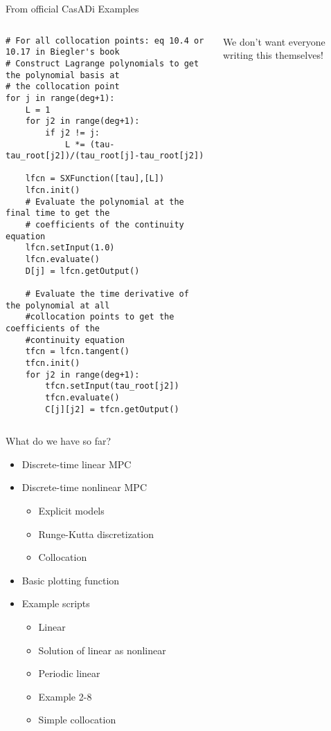 \documentclass[xcolor=dvipsnames]{beamer}
\begin{document}
\begin{frame}[fragile]{From official CasADi Examples}

\begin{columns}
    \begin{column}{.75\textwidth}
        
\begin{lstlisting}[style=python,basicstyle=\ttfamily\fontsize{6}{8}\selectfont]
# For all collocation points: eq 10.4 or 10.17 in Biegler's book
# Construct Lagrange polynomials to get the polynomial basis at
# the collocation point
for j in range(deg+1):
    L = 1
    for j2 in range(deg+1):
        if j2 != j:
            L *= (tau-tau_root[j2])/(tau_root[j]-tau_root[j2])
    
    lfcn = SXFunction([tau],[L])
    lfcn.init()
    # Evaluate the polynomial at the final time to get the
    # coefficients of the continuity equation
    lfcn.setInput(1.0)
    lfcn.evaluate()
    D[j] = lfcn.getOutput()
    
    # Evaluate the time derivative of the polynomial at all
    #collocation points to get the coefficients of the
    #continuity equation
    tfcn = lfcn.tangent()
    tfcn.init()
    for j2 in range(deg+1):
        tfcn.setInput(tau_root[j2])
        tfcn.evaluate()
        C[j][j2] = tfcn.getOutput()
\end{lstlisting}
    \end{column}
    \begin{column}{.25\textwidth}
        We don't want everyone writing this themselves!
    \end{column}
\end{columns}

\end{frame}

\begin{frame}{What do we have so far?}
    \begin{itemize}
        \item Discrete-time linear MPC
        \item Discrete-time nonlinear MPC
        \begin{itemize}
            \item Explicit models
            \item Runge-Kutta discretization
            \item Collocation
        \end{itemize}
        \item Basic plotting function
        \item Example scripts
        \begin{itemize}
            \item Linear
            \item Solution of linear as nonlinear
            \item Periodic linear
            \item Example 2-8
            \item Simple collocation
        \end{itemize}
    \end{itemize}
    
\end{frame}
\end{document}
